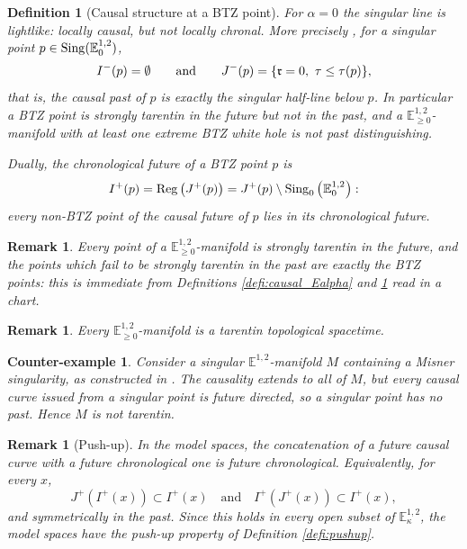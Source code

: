 \documentclass[a4paper,twoside]{article}
\newcommand{\mass}[1]{\mathbb{E}^{1,2}_{#1}}
\newtheorem{defi}[lem]{Definition}
\newtheorem{cexemple}[lem]{Counter-example}
\newtheorem{rem}[lem]{Remark}
\begin{document}
\begin{defi}[Causal structure at a BTZ point]\label{defi:causal_E0}
For $\alpha=0$ the singular line is lightlike: locally causal, but not locally chronal. More
precisely \cite[Section~1.2]{brunswic2021cauchy}, for a singular point $p\in \sing(\mass{0})$,
$$I^-(p)=\emptyset \qquad\text{and}\qquad J^-(p)=\{\mathfrak{r}=0,~\tau\leq \tau(p)\},$$
that is, the causal past of $p$ is exactly the singular half-line below $p$. In particular a BTZ
point is strongly tarentin in the future but not in the past, and a $\mass{\geq0}$-manifold with at
least one extreme BTZ white hole is not past distinguishing.

Dually, the chronological future of a BTZ point $p$ is
$$I^+(p)=\reg\left(J^+(p)\right)=J^+(p)\setminus \sing_0\left(\mass{0}\right):$$
every non-BTZ point of the causal future of $p$ lies in its chronological future.
\end{defi}

\begin{rem}\label{rem:btz_pas_tarentin}
Every point of a $\mass{\geq 0}$-manifold is strongly tarentin in the future, and the points which
fail to be strongly tarentin in the past are exactly the BTZ points: this is immediate from
Definitions \ref{defi:causal_Ealpha} and \ref{defi:causal_E0} read in a chart.
\end{rem}

\begin{rem}\label{rem:sing_tarentin}
Every $\mass{\geq0}$-manifold is a tarentin topological spacetime.
\end{rem}

\begin{cexemple}\label{cexemple:misner_tarentin}
Consider a singular $\mass{}$-manifold $M$ containing a Misner singularity, as constructed in
\cite{thesis}. The causality extends to all of $M$, but every causal curve issued from a
singular point is future directed, so a singular point has no past. Hence $M$ is not tarentin.
\end{cexemple}

\begin{rem}[Push-up]\label{rem:pushup}
In the model spaces, the concatenation of a future causal curve with a future chronological one is
future chronological. Equivalently, for every $x$,
$$J^+(I^+(x))\subset I^+(x)\quad\text{and}\quad I^+(J^+(x))\subset I^+(x),$$
and symmetrically in the past. Since this holds in every open subset of $\mass{\kappa}$, the model
spaces have the push-up property of Definition \ref{defi:pushup}.
\end{rem}
\end{document}
